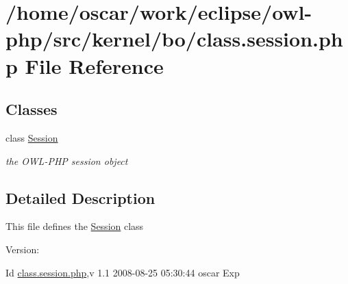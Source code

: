 \hypertarget{class_8session_8php}{
\section{/home/oscar/work/eclipse/owl-php/src/kernel/bo/class.session.php File Reference}
\label{class_8session_8php}
}
\subsection*{Classes}
\begin{CompactItemize}
\item 
class \hyperlink{classSession}{Session}
\begin{CompactList}\small\item\em the OWL-PHP session object \item\end{CompactList}\end{CompactItemize}


\subsection{Detailed Description}
This file defines the \hyperlink{classSession}{Session} class \begin{Desc}
\item[Version:]\end{Desc}
\begin{Desc}
\item[Id]\hyperlink{class_8session_8php}{class.session.php},v 1.1 2008-08-25 05:30:44 oscar Exp \end{Desc}
